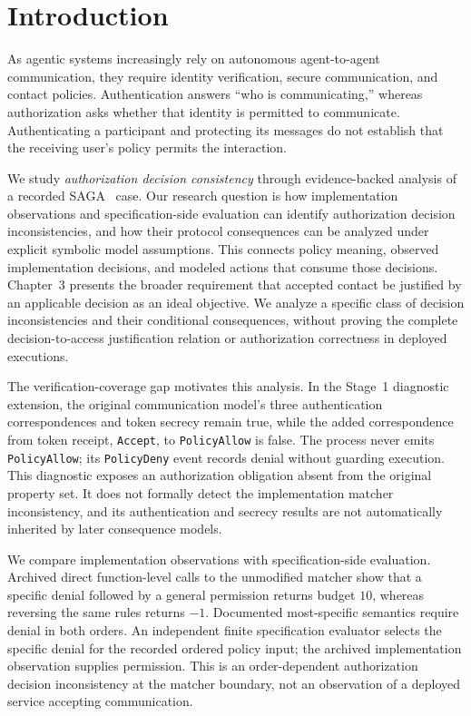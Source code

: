 \section{Introduction}

As agentic systems increasingly rely on autonomous agent-to-agent communication,
they require identity verification, secure communication, and contact policies.
Authentication answers ``who is communicating,'' whereas authorization asks
whether that identity is permitted to communicate. Authenticating a participant
and protecting its messages do not establish that the receiving user's policy
permits the interaction.

We study \emph{authorization decision consistency} through evidence-backed
analysis of a recorded SAGA~\cite{syros2025saga} case. Our research question is
how implementation observations and specification-side evaluation can identify
authorization decision inconsistencies, and how their protocol consequences
can be analyzed under explicit symbolic model assumptions. This connects
policy meaning, observed implementation decisions, and modeled actions that
consume those decisions. Chapter~3 presents the broader requirement that
accepted contact be justified by an applicable decision as an ideal objective.
We analyze a specific class of decision inconsistencies and their conditional
consequences, without proving the complete decision-to-access justification
relation or authorization correctness in deployed executions.

The verification-coverage gap motivates this analysis. In the Stage~1 diagnostic extension,
the original communication model's three authentication correspondences and
token secrecy remain true, while the added correspondence from token receipt,
\texttt{Accept}, to \texttt{PolicyAllow} is false. The process never emits
\texttt{PolicyAllow}; its \texttt{PolicyDeny} event records denial without
guarding execution. This diagnostic exposes an authorization obligation absent
from the original property set. It does not formally detect the implementation
matcher inconsistency, and its authentication and secrecy results are not
automatically inherited by later consequence models.

We compare implementation observations with specification-side
evaluation. Archived direct function-level calls to the unmodified matcher
show that a specific denial followed by a general permission returns budget
$10$, whereas reversing the same rules returns $-1$. Documented most-specific
semantics require denial in both orders. An independent finite specification
evaluator selects the specific denial for the recorded ordered policy input;
the archived implementation observation supplies permission. This is an
order-dependent authorization decision inconsistency at the matcher boundary,
not an observation of a deployed service accepting communication.

